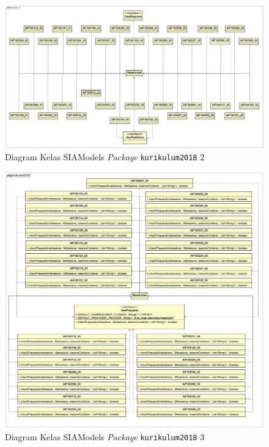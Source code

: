 \documentclass[a4paper,twoside]{article}
\begin{document}
\begin{enumerate}
		\begin{figure}[H]
		\centering
		\includegraphics[scale=0.35]{Gambar/class-diagram-siamodels-mk-kurikulum-2018-1}
		\caption{Diagram Kelas SIAModels \textit{Package} \texttt{kurikulum2018} 2}
		\label{fig:siamodels_class_2018_kurikulum_2}
		\end{figure}

		\begin{figure}[H]
		\centering
		\includegraphics[scale=0.135]{Gambar/class-diagram-siamodels-mk-kurikulum-2018-3}
		\caption{Diagram Kelas SIAModels \textit{Package} \texttt{kurikulum2018} 3}
		\label{fig:siamodels_class_2018_kurikulum_3}
		\end{figure}


\end{enumerate}
\end{document}
